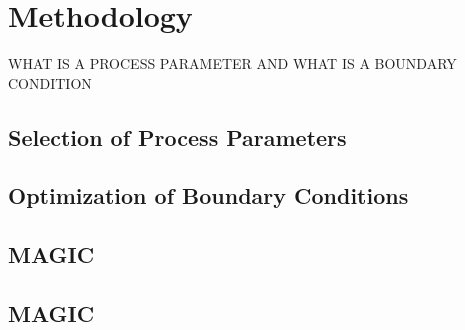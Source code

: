 \chapter{Methodology}%
 WHAT IS A PROCESS PARAMETER AND WHAT IS A BOUNDARY CONDITION 
\section{Selection of Process Parameters}%

\section{Optimization of Boundary Conditions}%

\section{MAGIC}%
\section{MAGIC}%

